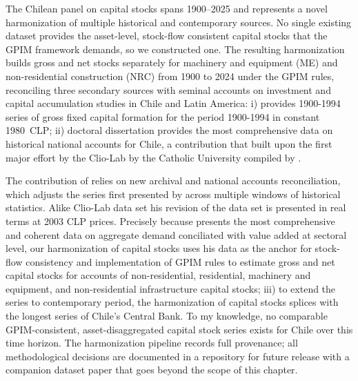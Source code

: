 \documentclass[11pt,a4paper]{article}
\begin{document}
{The Chilean panel on capital stocks spans 1900--2025 and represents a novel harmonization of multiple historical and contemporary sources. No single existing dataset provides the asset-level, stock-flow consistent capital stocks that the GPIM framework demands, so we constructed one. The resulting harmonization builds gross and net stocks separately for machinery and equipment (ME) and non-residential construction (NRC) from 1900 to 2024 under the GPIM rules, reconciling three secondary sources with seminal accounts on investment and capital accumulation studies in Chile and Latin America: i) \citet{Hofman2000} provides 1900-1994 series of gross fixed capital formation for the period 1900-1994 in constant 1980~CLP; ii) \citet{PerezEyzaguirre2019} doctoral dissertation provides the most comprehensive data on historical national accounts for Chile, a contribution that built upon the first major effort by the Clio-Lab by the Catholic University compiled by \citet{Luders2016}. 

The contribution of \citet{PerezEyzaguirre2019} relies on new archival and national accounts reconciliation, which adjusts the series first presented by \citet{Luders2016} across multiple windows of historical statistics. Alike Clio-Lab data set his revision of the data set is presented in real terms at 2003 CLP prices. Precisely because \citet{PerezEyzaguirre2019} presents the most comprehensive and coherent data on aggregate demand conciliated with value added at sectoral level, our harmonization of capital stocks uses his data as the anchor for stock-flow consistency and implementation of GPIM rules to estimate gross and net capital stocks for accounts of non-residential, residential, machinery and equipment, and non-residential infrastructure capital stocks; iii) to extend the series to contemporary period, the harmonization of capital stocks splices with the longest series of Chile's Central Bank. To my knowledge, no comparable GPIM-consistent, asset-disaggregated capital stock series exists for Chile over this time horizon. The harmonization pipeline records full provenance; all methodological decisions are documented in a repository for future release with a companion dataset paper that goes beyond the scope of this chapter. 

}
\end{document}
